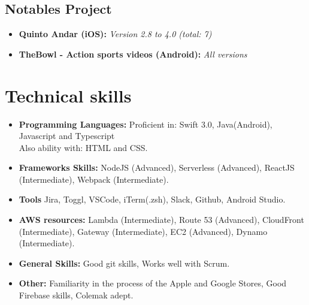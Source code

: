 \documentclass[11pt,a4paper,sans]{moderncv}
\begin{document}
\subsection{Notables Project}

\vspace{5pt}

\begin{itemize}

\item{\textbf{Quinto Andar (iOS):} \textit{Version 2.8 to 4.0 (total: 7)}}

\item{\textbf{TheBowl - Action sports videos (Android):} \textit{All versions}}

\end{itemize}

\section{Technical skills}

\vspace{6pt}

\begin{itemize}

\item \textbf{Programming Languages:} Proficient in: Swift 3.0, Java(Android), Javascript and Typescript\\ Also ability with: HTML and CSS.

\vspace{6pt}

\item \textbf{Frameworks Skills:} NodeJS (Advanced), Serverless (Advanced), ReactJS (Intermediate), Webpack (Intermediate).

\vspace{6pt}

\item \textbf{Tools} Jira, Toggl, VSCode, iTerm(.zsh), Slack, Github, Android Studio.
\vspace{6pt}

\item \textbf{AWS resources:}  Lambda (Intermediate), Route 53 (Advanced), CloudFront (Intermediate), Gateway (Intermediate), EC2 (Advanced), Dynamo (Intermediate).

\vspace{6pt}

\item \textbf{General Skills:} Good git skills, Works well with Scrum.

\vspace{6pt}

\item \textbf{Other:} Familiarity in the process of the Apple and Google Stores, Good Firebase skills, Colemak adept.

\end{itemize}
\end{document}
